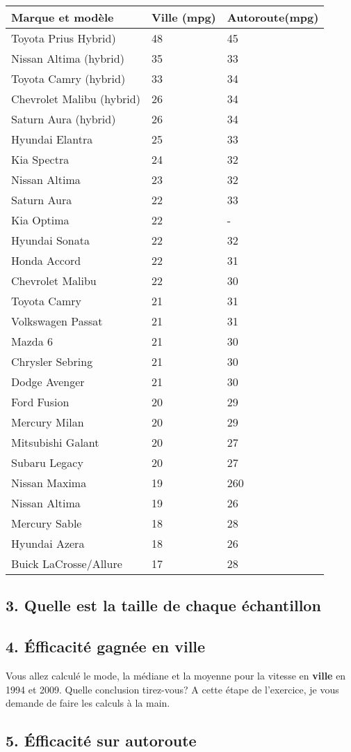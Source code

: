 \documentclass[
]{article}
\begin{document}
\begin{longtable}[]{@{}lll@{}}
\toprule
Marque et modèle & Ville (mpg) & Autoroute(mpg)\tabularnewline
\midrule
\endhead
Toyota Prius Hybrid) & 48 & 45\tabularnewline
Nissan Altima (hybrid) & 35 & 33\tabularnewline
Toyota Camry (hybrid) & 33 & 34\tabularnewline
Chevrolet Malibu (hybrid) & 26 & 34\tabularnewline
Saturn Aura (hybrid) & 26 & 34\tabularnewline
Hyundai Elantra & 25 & 33\tabularnewline
Kia Spectra & 24 & 32\tabularnewline
Nissan Altima & 23 & 32\tabularnewline
Saturn Aura & 22 & 33\tabularnewline
Kia Optima & 22 & -\tabularnewline
Hyundai Sonata & 22 & 32\tabularnewline
Honda Accord & 22 & 31\tabularnewline
Chevrolet Malibu & 22 & 30\tabularnewline
Toyota Camry & 21 & 31\tabularnewline
Volkswagen Passat & 21 & 31\tabularnewline
Mazda 6 & 21 & 30\tabularnewline
Chrysler Sebring & 21 & 30\tabularnewline
Dodge Avenger & 21 & 30\tabularnewline
Ford Fusion & 20 & 29\tabularnewline
Mercury Milan & 20 & 29\tabularnewline
Mitsubishi Galant & 20 & 27\tabularnewline
Subaru Legacy & 20 & 27\tabularnewline
Nissan Maxima & 19 & 260\tabularnewline
Nissan Altima & 19 & 26\tabularnewline
Mercury Sable & 18 & 28\tabularnewline
Hyundai Azera & 18 & 26\tabularnewline
Buick LaCrosse/Allure & 17 & 28\tabularnewline
\bottomrule
\end{longtable}

\hypertarget{quelle-est-la-taille-de-chaque-uxe9chantillon}{%
\subsection{3. Quelle est la taille de chaque
échantillon}\label{quelle-est-la-taille-de-chaque-uxe9chantillon}}

\hypertarget{uxe9fficacituxe9-gagnuxe9e-en-ville}{%
\subsection{4. Éfficacité gagnée en
ville}\label{uxe9fficacituxe9-gagnuxe9e-en-ville}}

Vous allez calculé le mode, la médiane et la moyenne pour la vitesse en
\textbf{ville} en 1994 et 2009. Quelle conclusion tirez-vous? A cette
étape de l'exercice, je vous demande de faire les calculs à la main.

\hypertarget{uxe9fficacituxe9-sur-autoroute}{%
\subsection{5. Éfficacité sur
autoroute}\label{uxe9fficacituxe9-sur-autoroute}}
\end{document}
